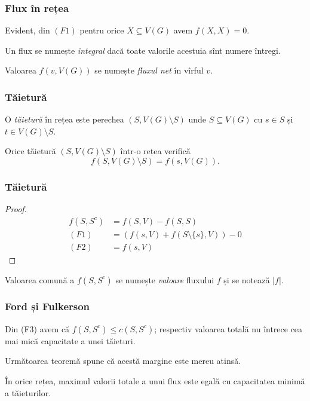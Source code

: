 \begin{frame}
  \frametitle{Flux în rețea}

Evident, din $(F1)$ pentru orice $X\subseteq V(G)$ avem $f(X,X)=0$.

Un flux se numește \emph{integral} dacă toate valorile acestuia sînt numere întregi.

Valoarea $f(v,V(G))$ se numește \emph{fluxul net} în vîrful $v$. 

\end{frame}

\begin{frame}
  \frametitle{Tăietură}

O \emph{tăietură} în rețea este perechea $(S,V(G)\setminus S)$ unde $S\subseteq V(G)$ cu $s\in S$ și $t\in V(G)\setminus S$.

\begin{theorem}
Orice tăietură $(S,V(G)\setminus S)$ într-o rețea verifică 
\[
  f(S,V(G)\setminus S)=f(s,V(G)).
\]
 
\end{theorem}


\end{frame}

\begin{frame}
  \frametitle{Tăietură}

\begin{proof}
\[
  \begin{array}{ll}
    f(S,S^c)	&= f(S,V) - f(S,S)\\
    (F1)	&= (f(s,V) + f(S\setminus\{s\},V)) - 0\\
    (F2)	&= f(s,V)
  \end{array}
\]
 
\end{proof}

Valoarea comună a $f(S,S^c)$ se numește \emph{valoare} fluxului $f$ și se notează $|f|$.

\end{frame}

\begin{frame}
  \frametitle{Ford și Fulkerson}

Din (F3) avem că $f(S,S^c)\leq c(S,S^c)$; respectiv valoarea totală nu întrece cea mai mică capacitate a unei tăieturi.

Următoarea teoremă spune că acestă margine este mereu atinsă.

\begin{theorem}
În orice rețea, maximul valorii totale a unui flux este egală cu capacitatea minimă a tăieturilor.
\end{theorem}

\end{frame}

